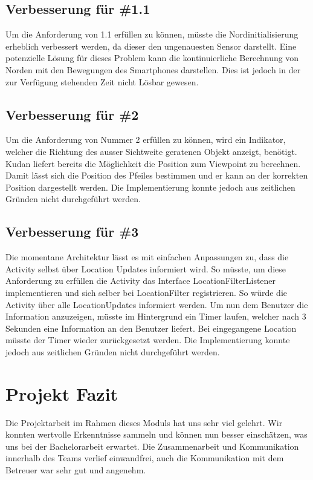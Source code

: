 \documentclass[a4paper]{scrreprt}
\begin{document}
\subsection{Verbesserung für \#1.1}
Um die Anforderung von 1.1 erfüllen zu können, müsste die Nordinitialisierung erheblich verbessert werden, da dieser den ungenauesten Sensor darstellt. Eine potenzielle Lösung für dieses Problem kann die kontinuierliche Berechnung von Norden mit den Bewegungen des Smartphones darstellen. Dies ist jedoch in der zur Verfügung stehenden Zeit nicht Lösbar gewesen.

\subsection{Verbesserung für \#2}
Um die Anforderung von Nummer 2 erfüllen zu können, wird ein Indikator, welcher die Richtung des ausser Sichtweite geratenen Objekt anzeigt, benötigt. Kudan liefert bereits die Möglichkeit die Position zum Viewpoint zu berechnen. Damit lässt sich die Position des Pfeiles bestimmen und er kann an der korrekten Position dargestellt werden. Die Implementierung konnte jedoch aus zeitlichen Gründen nicht durchgeführt werden.

\subsection{Verbesserung für \#3}
Die momentane Architektur lässt es mit einfachen Anpassungen zu, dass die Activity selbst über Location Updates informiert wird. So müsste, um diese Anforderung zu erfüllen die Activity das Interface LocationFilterListener implementieren und sich selber bei LocationFilter registrieren. So würde die Activity über alle LocationUpdates informiert werden. Um nun dem Benutzer die Information anzuzeigen, müsste im Hintergrund ein Timer laufen, welcher nach 3 Sekunden eine Information an den Benutzer liefert. Bei eingegangene Location müsste der Timer wieder zurückgesetzt werden. Die Implementierung konnte jedoch aus zeitlichen Gründen nicht durchgeführt werden.

\section{Projekt Fazit}
Die Projektarbeit im Rahmen dieses Moduls hat uns sehr viel gelehrt. Wir konnten wertvolle Erkenntnisse sammeln und können nun besser einschätzen, was uns bei der Bachelorarbeit erwartet. Die Zusammenarbeit und Kommunikation innerhalb des Teams verlief einwandfrei, auch die Kommunikation mit dem Betreuer war sehr gut und angenehm.
\end{document}
